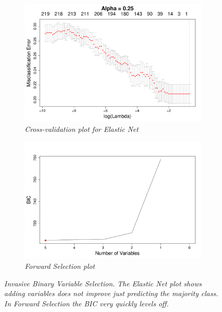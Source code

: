 \documentclass{article}
\begin{document}
\begin{figure}[h!]
\begin{subfigure}[b]{0.5\textwidth}
\includegraphics[width=\textwidth]{elastic_cv_invasive_binary.pdf}
\caption{\textsl{\small  Cross-validation plot for Elastic Net}}
\end{subfigure}
\hfill
\begin{subfigure}[b]{0.5\textwidth}
\includegraphics[width=\textwidth]{forward_nvars_invasive_binary.pdf}
\caption{\textsl{\small Forward Selection plot}}
\end{subfigure}
\caption{\textsl{\small Invasive Binary Variable Selection. The Elastic Net plot shows adding variables does not improve just predicting the majority class. In Forward Selection the BIC very quickly levels off.}}
\label{figure:invasive_binary_opt}
\end{figure}
\end{document}
